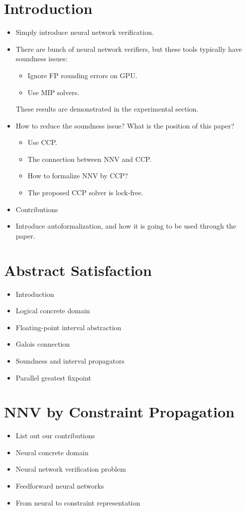 \documentclass[a4paper]{report}
\begin{document}
\section{Introduction}
\begin{itemize}
\item Simply introduce neural network verification.
\item There are bunch of neural network verifiers, but these tools typically have soundness issues:
	\begin{itemize}
	\item Ignore FP rounding errors on GPU.
	\item Use MIP solvers.
	\end{itemize}
These results are demonstrated in the experimental section.
\item How to reduce the soundness issue? What is the position of this paper?
	\begin{itemize}
	\item Use CCP.
	\item The connection between NNV and CCP.
	\item How to formalize NNV by CCP?
	\item The proposed CCP solver is lock-free.
	\end{itemize}
\item Contributions 
\item Introduce autoformalization, and how it is going to be used through the paper.
\end{itemize}

\section{Abstract Satisfaction}
\begin{itemize}
\item Introduction
\item Logical concrete domain
\item Floating-point interval abstraction
\item Galois connection 
\item Soundness and interval propagators
\item Parallel greatest fixpoint 
\end{itemize}

\section{NNV by Constraint Propagation}
\begin{itemize}
\item List out our contributions 
\item Neural concrete domain 
\item Neural network verification problem 
\item Feedforward neural networks 
\item From neural to constraint representation 
\end{itemize}
\end{document}
